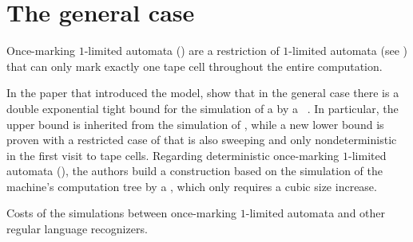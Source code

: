 \section{The general case}\label{sec:oncemarking-general}
Once-marking $1$-limited automata (\OMOLAs) are a restriction of $1$-limited automata (see ) that can only mark exactly one tape cell throughout the entire computation.

In the paper that introduced the model, \citeauthor{PigPri23a} show that in the general case there is a double exponential tight bound for the simulation of a \OMOLA by a \ODFA~\cite{PigPri23a}.
In particular, the upper bound is inherited from the simulation of \OLAs, while a new lower bound is proven with a restricted case of \OMOLA that is also sweeping and only nondeterministic in the first visit to tape cells.
Regarding deterministic once-marking $1$-limited automata (\OMODLAs), the authors build a construction based on the simulation of the machine's computation tree by a \TDFA, which only requires a cubic size increase.

\begin{table}
	\centering
	\caption{Costs of the simulations between once-marking $1$-limited automata and other regular language recognizers.}
	\label{tab:sims-om-general-oncemarking}
\end{table}

